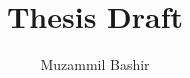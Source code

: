 \documentclass{article}
\title{Thesis Draft}
\author{Muzammil Bashir }
\begin{document}


\doublespacing

\tableofcontents
\newpage
\listoffigures
\newpage
\listoftables
\newpage
\lstlistoflistings
\newpage











\newpage
\singlespacing

 
\end{document}
